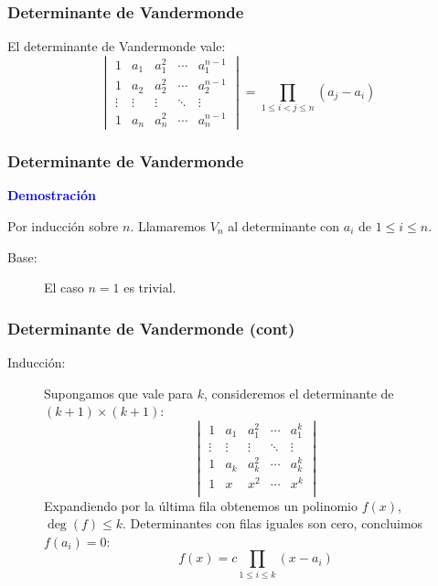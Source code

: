 \documentclass[english, spanish, fleqn,%
hyperref = {colorlinks, urlcolor = blue}%
]{beamer}
\begin{document}
\begin{frame}
  \frametitle{Determinante de Vandermonde}

  \begin{theorem}
      El determinante de Vandermonde vale:
    \begin{equation*}
      \begin{vmatrix}
        1 & a_1 & a_1^2 & \cdots & a_1^{n - 1} \\
        1 & a_2 & a_2^2 & \cdots & a_2^{n - 1} \\
        \vdots & \vdots & \vdots & \ddots & \vdots \\
        1 & a_n & a_n^2 & \cdots & a_n^{n - 1}
      \end{vmatrix}
        = \prod_{1 \le i < j \le n} (a_j - a_i)
    \end{equation*}
  \end{theorem}
\end{frame}

\begin{frame}
  \frametitle{Determinante de Vandermonde}

  \textbf{\large\textcolor{blue}{Demostración}}

  Por inducción sobre \(n\).
  Llamaremos \(V_n\) al determinante con \(a_i\) de \(1 \le i \le n\).
  \begin{description}
  \item[Base:]
    El caso \(n = 1\) es trivial.
  \end{description}
\end{frame}

\begin{frame}
  \frametitle{Determinante de Vandermonde (cont)}

  \begin{description}
  \item[Inducción:]
    Supongamos que vale para \(k\),
    consideremos el determinante de \((k + 1) \times (k + 1)\):
    \begin{equation*}
      \begin{vmatrix}
        1 & a_1 & a_1^2 & \cdots & a_1^k \\
        \vdots & \vdots & \vdots & \ddots & \vdots \\
        1 & a_k & a_k^2 & \cdots & a_k^k \\
        1 & x	  & x^2	  & \cdots & x^k \\
      \end{vmatrix}
    \end{equation*}
    Expandiendo por la última fila
    obtenemos un polinomio \(f(x)\),
    \(\deg(f) \le k\).
    Determinantes con filas iguales son cero,
    concluimos \(f(a_i) = 0\):
    \begin{equation*}
      f(x)
        = c \prod_{1 \le i \le k} (x - a_i)
    \end{equation*}
  \end{description}
\end{frame}
\end{document}
